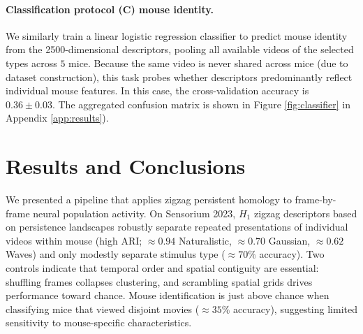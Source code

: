 \documentclass[11pt]{article}
\begin{document}
\paragraph{Classification protocol (C) mouse identity. }
We similarly train a linear logistic regression classifier to predict mouse identity from the 2500-dimensional descriptors, pooling all available videos of the selected types across $5$ mice. Because the same video is never shared across mice (due to dataset construction), this task probes whether descriptors predominantly reflect individual mouse features. In this case, the cross-validation accuracy is $\mathbf{0.36 \pm 0.03}$. The aggregated confusion matrix is shown in Figure \ref{fig:classifier} in Appendix \ref{app:results}).
\section{Results and Conclusions}

We presented a pipeline that applies zigzag persistent homology to frame-by-frame neural population activity. On Sensorium 2023, $H_1$ zigzag descriptors based on persistence landscapes robustly separate repeated presentations of individual videos within mouse (high ARI; $\approx 0.94$ Naturalistic, $\approx 0.70$ Gaussian, $\approx 0.62$ Waves) and only modestly separate stimulus type ($\approx 70\%$ accuracy). Two controls indicate that temporal order and spatial contiguity are essential: shuffling frames collapses clustering, and scrambling spatial grids drives performance toward chance. Mouse identification is just above chance when classifying mice that viewed disjoint movies ($\approx 35\%$ accuracy), suggesting limited sensitivity to mouse-specific characteristics.
\end{document}
